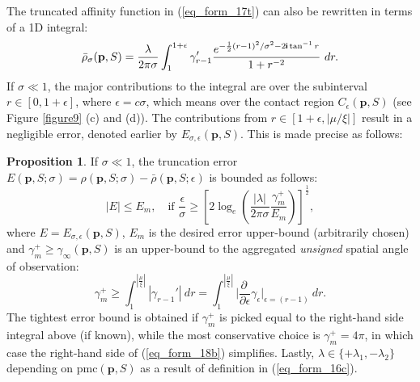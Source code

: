 \documentclass[article]{gmp2014}
\theoremstyle{definition}
\newtheorem{prop}{\textsf{\textbf{{Proposition}}}}
\newcommand{\ii}{\text{\textsf{\textbf{i}}}}
\begin{document}
The truncated affinity function in (\ref{eq_form_17t}) can also be rewritten in terms of a 1D integral:
%
\begin{equation}
    \bar{\rho}_\sigma(\mathbf{p}, S) = \frac{\lambda}{2\pi\sigma} \int_1^{1 + \epsilon} \gamma_{r-1}' \frac{e^{-\frac{1}{2}(r - 1)^2/\sigma^2 - 2 \ii \tan^{-1}r}}{1 + r^{-2}}~ dr. \label{eq_form_17C}
\end{equation}
%
If $\sigma \ll 1$, the major contributions to the integral are over the subinterval $r \in [0, 1 + \epsilon]$, where $\epsilon = c\sigma$, which means over the contact region $C_\epsilon(\mathbf{p}, S)$ (see Figure \ref{figure9} (c) and (d)). The contributions from $r \in [1 + \epsilon, |\mu/\xi|]$ result in a negligible error, denoted earlier by $E_{\sigma, \epsilon}(\mathbf{p}, S)$. This is made precise as follows:
%
\begin{prop}
    If $\sigma \ll 1$, the truncation error $E(\mathbf{p}, S; \sigma) = \rho(\mathbf{p}, S; \sigma) - \bar{\rho}(\mathbf{p}, S; \epsilon)$ is bounded as follows:
    \begin{equation}
        |E| \leq E_m , \quad \text{if } \frac{\epsilon}{\sigma} \geq \left[ 2\log_e\left(\frac{|\lambda|}{2\pi \sigma} \frac{\gamma_m^+}{E_m} \right) \right]^{\frac{1}{2}}, \label{eq_form_18b}
    \end{equation}
    where $E = E_{\sigma, \epsilon}(\mathbf{p}, S)$, $E_m$ is the desired error upper-bound (arbitrarily chosen) and $\gamma_m^+ \geq \gamma_\infty(\mathbf{p}, S)$ is an upper-bound to the aggregated {\it unsigned} spatial angle of observation:
    \begin{equation}
        \gamma_m^+ \geq \int_1^{|\frac{\mu}{\xi}|} |\gamma_{r-1}'|~dr = \int_1^{|\frac{\mu}{\xi}|} \big|\frac{\partial~}{\partial \epsilon}\gamma_\epsilon \big|_{\epsilon = (r-1)} ~dr.
    \end{equation}
    The tightest error bound is obtained if $\gamma_m^+$ is picked equal to the right-hand side integral above (if known), while the most conservative choice is $\gamma_m^+ = 4\pi$, in which case the right-hand side of (\ref{eq_form_18b}) simplifies.
    Lastly, $\lambda \in \{+\lambda_1, -\lambda_2\}$ depending on $\mathrm{pmc}(\mathbf{p}, S)$ as a result of definition in {\rm (\ref{eq_form_16c})}.
\end{prop}
%
\end{document}
